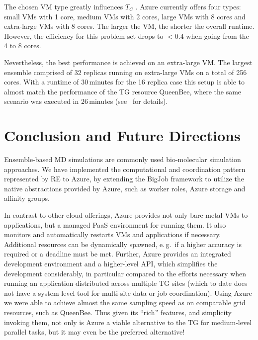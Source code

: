 \documentclass[conference,final]{IEEEtran}
\newcommand{\up}{\vspace*{-1em}}
\newcommand{\tc}{$T_{C}$ }
\begin{document}
The chosen VM type greatly influences \tc. Azure currently offers four
types: small VMs with 1 core, medium VMs with 2 cores, large VMs with 8 cores
and extra-large VMs with 8 cores. The larger the VM, the shorter the overall runtime.
However, the efficiency for this problem set drops to $<0.4$ when going from the 4 to 8 cores. 

Nevertheless, the best performance is achieved on an extra-large
VM. The largest ensemble comprised of 32 replicas running on
extra-large VMs on a total of 256 cores.  With a runtime of
30\,minutes for the 16 replica case this setup is able to almost match
the performance of the TG resource QueenBee, where the same scenario
was executed in 26\,minutes (see~\cite{repex_ptrsb} for details).

\up
\section{Conclusion and Future Directions}
\up

Ensemble-based MD simulations %
are commonly used bio-molecular simulation
approaches. %
We have implemented the computational and coordination pattern
represented by RE to Azure, by extending the BigJob framework to
utilize the native abstractions provided by Azure, such as worker
roles, Azure storage and affinity groups.

In contrast to other cloud offerings, Azure provides not only
bare-metal VMs to applications, but a managed PaaS environment for
running them. It also monitors and automatically restarts VMs and
applications if necessary. Additional resources can be dynamically
spawned, e.\,g.\ if a higher accuracy is required or a deadline must
be met. Further, Azure provides an integrated development environment
and a higher-level API, which simplifies the development considerably,
in particular compared to the efforts necessary when running an
application distributed across multiple TG sites (which to date does
not have a system-level tool for multi-site data or job
coordination). Using Azure we were able to achieve almost the same
sampling speed as on comparable grid resources, such as QueenBee.
Thus given its ``rich'' features, and simplicity invoking them, not
only is Azure a viable alternative to the TG for medium-level parallel
tasks, but it may even be the preferred alternative!
\end{document}

